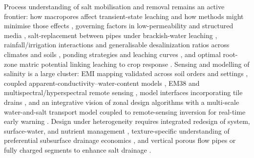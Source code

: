 Process understanding of salt mobilisation and removal remains an active frontier:
how macropores affect transient-state leaching and how methods might minimise those
effects \parencite{Xin2016}, governing factors in low-permeability and structured
media \parencite{Zhang2022}, salt-replacement between pipes under brackish-water
leaching \parencite{Li2023}, rainfall/irrigation interactions and generalisable
desalinization ratios across climates and soils
\parencite{Yu2015,Chen2025,Wang2024d}, ponding strategies and leaching curves
\parencite{RAO1991,Yang2022c}, and optimal root-zone matric potential linking
leaching to crop response \parencite{Zhang2021,Heng2021}. Sensing and modelling of
salinity is a large cluster: EMI mapping validated across soil orders and settings
\parencite{Narjary2024}, coupled apparent-conductivity--water-content models
\parencite{Yu2025}, EM38 and multispectral/hyperspectral remote sensing
\parencite{Singh2020d}, model interfaces incorporating tile drains
\parencite{Singh2020d,Jayawardane2001}, and an integrative vision of zonal design
algorithms with a multi-scale water-and-salt transport model coupled to
remote-sensing inversion for real-time early warning \parencite{Zhu2025b}.
Design under heterogeneity requires integrated redesign of system, surface-water,
and nutrient management \parencite{vandenEertwegh2006}, texture-specific
understanding of preferential subsurface drainage economics \parencite{Neha2022},
and vertical porous flow pipes or fully charged segments to enhance salt drainage
\parencite{Wang2024d,Yao2024,Jayawardane2001}.

